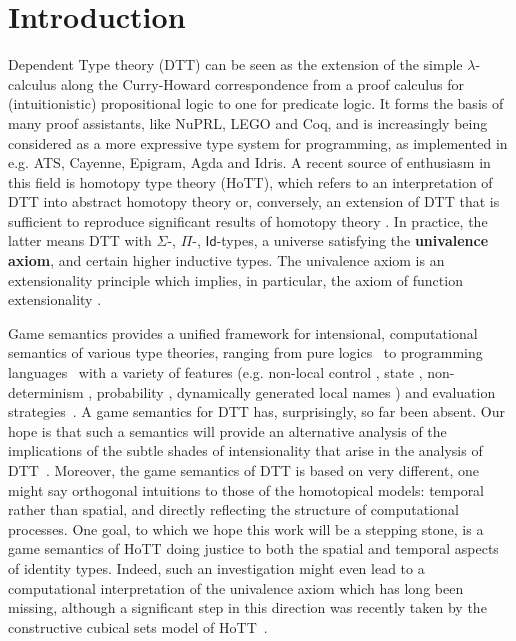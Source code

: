 \documentclass[runningheads,a4paper]{llncs}
\renewcommand{\emph}[1]{\textbf{#1}}
\begin{document}
\section{Introduction}
\vspace{-7pt}
Dependent Type theory (\textsf{DTT}) can be seen as the extension of the simple $\lambda$-calculus along the Curry-Howard correspondence from a proof calculus for (intuitionistic) propositional logic to one for predicate logic. It forms the basis of many proof assistants, like NuPRL, LEGO and Coq, and is increasingly being considered as a more expressive type system for programming, as implemented in e.g. ATS, Cayenne, Epigram, Agda and Idris. \cite{altenkirch2005dependent} A recent source of enthusiasm in this field is homotopy type theory (\textsf{HoTT}), which refers to an interpretation of \textsf{DTT} into abstract homotopy theory \cite{awodey2009homotopy} or, conversely, an extension of \textsf{DTT} that is sufficient to reproduce significant results of homotopy theory \cite{hottbook}. In practice, the latter means \textsf{DTT} with $\Sigma$-, $\Pi$-, $\mathsf{Id}$-types, a universe satisfying the \emph{univalence axiom}, and certain higher inductive types. The univalence axiom is an extensionality principle which implies, in particular, the axiom of function extensionality \cite{hottbook}.

Game semantics provides a unified framework for intensional, computational semantics of various type theories, ranging from pure logics~\cite{abramsky1994gamesll} to programming languages~\cite{hyland2000full,abramsky2000full,abramsky2005game} with a variety of features (e.g. non-local control \cite{laird1997full}, state \cite{abramsky1996linearity,abramsky1998fully,murawski2011game}, non-determinism \cite{harmer1999fully}, probability \cite{danos2002probabilistic}, dynamically generated local names \cite{abramsky2004nominal}) and evaluation strategies~\cite{abramsky1998cbvgames}. A game semantics for \textsf{DTT}  has,  surprisingly, so far been  absent.   
Our hope is that such a  semantics  will provide an alternative analysis of the implications of the subtle shades of intensionality that arise in the analysis of \textsf{DTT}~\cite{streicher1993investigations,hofmann1997syntax}. 
Moreover, the game semantics of \textsf{DTT} is based on very different, one might say orthogonal intuitions to those of the homotopical models: temporal  rather than spatial, and directly reflecting the structure of computational processes. One goal, to which we hope this work  will be a stepping stone, is a game semantics of \textsf{HoTT} doing justice to both the spatial and temporal aspects of identity types. Indeed, such an investigation might even lead to a computational interpretation of the univalence axiom which has long been missing, although a significant step in this direction was recently taken by the constructive cubical sets model of \textsf{HoTT}~\cite{bezem2014model}.  
\end{document}
